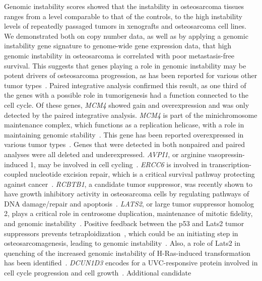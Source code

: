 Genomic instability scores showed that the
instability in osteosarcoma tissues ranges from a
level comparable to that of the controls, to the
high instability levels of repeatedly passaged
tumors in xenografts and osteosarcoma cell lines.
We demonstrated both on copy number data, as
well as by applying a genomic instability gene
signature to genome\hyp{}wide gene expression data,
that high genomic instability in osteosarcoma is
correlated with poor metastasis\hyp{}free survival. This
suggests that genes playing a role in genomic
instability may be potent drivers of osteosarcoma
progression, as has been reported for various
other tumor types~\cite{carter2006signature}. Paired
integrative analysis confirmed this result, as one
third of the genes with a possible role in tumorigenesis
had a function connected to the cell
cycle. Of these genes, {\it MCM4} showed gain and
overexpression and was only detected by the
paired integrative analysis. {\it MCM4} is part of the
minichromosome maintenance complex, which
functions as a replication helicase, with a role in
maintaining genomic stability~\cite{aguilera2008genome}. This gene has been
reported overexpressed in various tumor types~\cite{freeman1999minichromosome,alison2002minichromosome,majid2010regulation}. Genes that were detected in both
nonpaired and paired analyses were all deleted
and underexpressed. {\it AVPI1}, or arginine vasopressin\hyp{}induced 1, may be involved in cell cycling~\cite{apweiler2011ongoing}. {\it ERCC6} is involved
in transcription\hyp{}coupled nucleotide excision
repair, which is a critical survival pathway protecting
against cancer~\cite{fousteri2008transcription}. {\it RCBTB1}, a candidate tumor suppressor,
was recently shown to have growth inhibitory activity
in osteosarcoma cells by regulating pathways
of DNA damage/repair and apoptosis~\cite{zhou2010clld7}.
{\it LATS2}, or large tumor suppressor
homolog 2, plays a critical role in centrosome
duplication, maintenance of mitotic fidelity,
and genomic instability~\cite{visser2010lats}.
Positive feedback between the p53 and Lats2 tumor
suppressors prevents tetraploidization~\cite{aylon2006positive},
which could be an initiating step in
osteosarcomagenesis, leading to genomic instability~\cite{ganem2007limiting,ganem2007tetraploidy}. Also, a role of Lats2 in quenching of the
increased genomic instability of H-Ras\hyp{}induced
transformation has been identified~\cite{aylon2006positive}. {\it DCUN1D3} encodes for a UVC\hyp{}responsive
protein involved in cell cycle progression and cell
growth~\cite{ma2008dcun1d3}. Additional candidate
